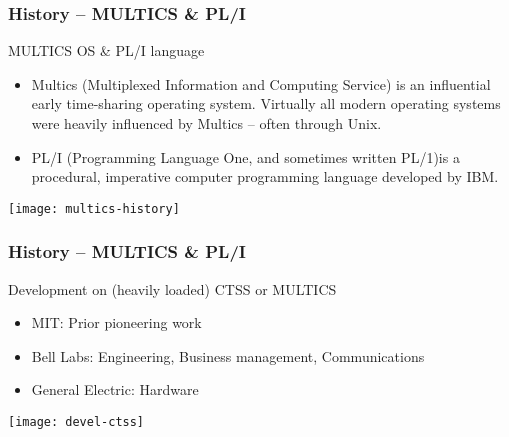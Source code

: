 \begin{frame}[plain]
	\frametitle{History -- MULTICS \& PL/I}
	
	MULTICS OS \& PL/I language
	
    \begin{itemize}
		\item Multics (Multiplexed Information and Computing Service) is an influential early time-sharing operating system. Virtually all modern operating systems were heavily influenced by Multics – often through Unix.
		
		\item PL/I (Programming Language One, and sometimes written PL/1)is a procedural, imperative computer programming language developed by IBM.
	\end{itemize}
	\centering

	
	\texttt{[image: multics-history]}
	
	
	
	
\end{frame}


\begin{frame}[plain]
	\frametitle{History -- MULTICS \& PL/I}
	
	Development on (heavily loaded) CTSS or MULTICS
	
	
	\begin{itemize}
		\item MIT: Prior pioneering work
		\item Bell Labs: Engineering, Business management, Communications
		\item General Electric: Hardware
	\end{itemize}
	\centering
	
	
	\texttt{[image: devel-ctss]}
	
	
	
	
\end{frame}

